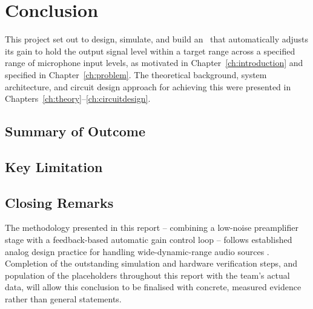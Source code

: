 \chapter{Conclusion}
\label{ch:conclusion}

This project set out to design, simulate, and build an \projecttitle\ that automatically adjusts its gain to hold the output signal level within a target range across a specified range of microphone input levels, as motivated in Chapter~\ref{ch:introduction} and specified in Chapter~\ref{ch:problem}. The theoretical background, system architecture, and circuit design approach for achieving this were presented in Chapters~\ref{ch:theory}--\ref{ch:circuitdesign}.

\section{Summary of Outcome}


\section{Key Limitation}


\section{Closing Remarks}

The methodology presented in this report -- combining a low-noise preamplifier stage with a feedback-based automatic gain control loop -- follows established analog design practice for handling wide-dynamic-range audio sources \cite{ref1,ref2,ref5,ref6}. Completion of the outstanding simulation and hardware verification steps, and population of the placeholders throughout this report with the team's actual data, will allow this conclusion to be finalised with concrete, measured evidence rather than general statements.

